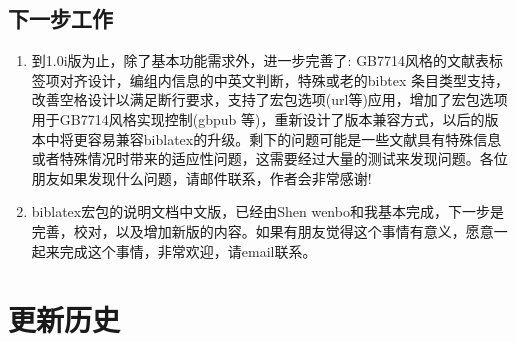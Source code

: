 \subsection{下一步工作}

\begin{enumerate}
  \item 到1.0i版为止，除了基本功能需求外，进一步完善了: GB7714风格的文献表标签项对齐设计，编组内信息的中英文判断，特殊或老的bibtex 条目类型支持，改善空格设计以满足断行要求，支持了宏包选项(url等)应用，增加了宏包选项用于GB7714风格实现控制(gbpub 等)，重新设计了版本兼容方式，以后的版本中将更容易兼容biblatex的升级。剩下的问题可能是一些文献具有特殊信息或者特殊情况时带来的适应性问题，这需要经过大量的测试来发现问题。各位朋友如果发现什么问题，请邮件联系，作者会非常感谢!





  \item biblatex宏包的说明文档中文版，已经由Shen wenbo和我基本完成，下一步是完善，校对，以及增加新版的内容。如果有朋友觉得这个事情有意义，愿意一起来完成这个事情，非常欢迎，请email联系。


\end{enumerate}

\section{更新历史}






